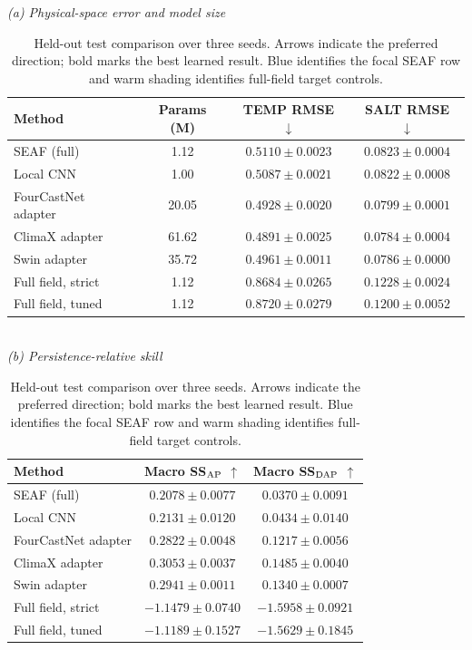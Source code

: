 \documentclass[conference]{IEEEtran}
\begin{document}
\begin{table}[H]
\centering
\caption{Held-out test comparison over three seeds. Arrows indicate the preferred direction; bold marks the best learned result. Blue identifies the focal SEAF row and warm shading identifies full-field target controls.}
\label{tab:test_main}
\scriptsize
\setlength{\tabcolsep}{3.2pt}
\renewcommand{\arraystretch}{1.08}
\textit{(a) Physical-space error and model size}\\[2pt]
\begin{tabular}{lccc}
\toprule
Method & Params (M) & TEMP RMSE $\downarrow$ & SALT RMSE $\downarrow$\\
\midrule
\rowcolor{seafblue} SEAF (full) & 1.12 & $0.5110\!\pm\!0.0023$ & $0.0823\!\pm\!0.0004$\\
Local CNN & 1.00 & $0.5087\!\pm\!0.0021$ & $0.0822\!\pm\!0.0008$\\
FourCastNet adapter & 20.05 & $0.4928\!\pm\!0.0020$ & $0.0799\!\pm\!0.0001$\\
ClimaX adapter & 61.62 & $\mathbf{0.4891\!\pm\!0.0025}$ & $\mathbf{0.0784\!\pm\!0.0004}$\\
Swin adapter & 35.72 & $0.4961\!\pm\!0.0011$ & $0.0786\!\pm\!0.0000$\\
\addlinespace[2pt]
\rowcolor{seafwarm} Full field, strict & 1.12 & $0.8684\!\pm\!0.0265$ & $0.1228\!\pm\!0.0024$\\
\rowcolor{seafwarm} Full field, tuned & 1.12 & $0.8720\!\pm\!0.0279$ & $0.1200\!\pm\!0.0052$\\
\bottomrule
\end{tabular}\\[5pt]
\textit{(b) Persistence-relative skill}\\[2pt]
\begin{tabular}{lcc}
\toprule
Method & Macro SS$_{\rm AP}$ $\uparrow$ & Macro SS$_{\rm DAP}$ $\uparrow$\\
\midrule
\rowcolor{seafblue} SEAF (full) & $0.2078\!\pm\!0.0077$ & $0.0370\!\pm\!0.0091$\\
Local CNN & $0.2131\!\pm\!0.0120$ & $0.0434\!\pm\!0.0140$\\
FourCastNet adapter & $0.2822\!\pm\!0.0048$ & $0.1217\!\pm\!0.0056$\\
ClimaX adapter & $\mathbf{0.3053\!\pm\!0.0037}$ & $\mathbf{0.1485\!\pm\!0.0040}$\\
Swin adapter & $0.2941\!\pm\!0.0011$ & $0.1340\!\pm\!0.0007$\\
\addlinespace[2pt]
\rowcolor{seafwarm} Full field, strict & $-1.1479\!\pm\!0.0740$ & $-1.5958\!\pm\!0.0921$\\
\rowcolor{seafwarm} Full field, tuned & $-1.1189\!\pm\!0.1527$ & $-1.5629\!\pm\!0.1845$\\
\bottomrule
\end{tabular}
\end{table}
\end{document}
